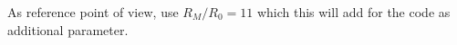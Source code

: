 \message{ !name(brief_Brownian_dynamics.tex)}\documentclass[10pt, a4paper]{report}
\begin{document}
As reference point of view, \textcite{Ianniruberto:2015dv} use $R_M/R_0 = 11$ which this will add for the code as additional parameter.


\end{document}
